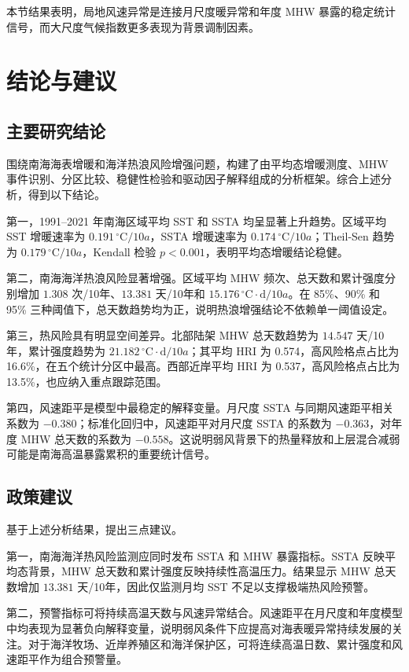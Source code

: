 \documentclass[UTF8,a4paper,zihao=-4,fontset=fandol]{ctexart}
\begin{document}
本节结果表明，局地风速异常是连接月尺度暖异常和年度 MHW 暴露的稳定统计信号，而大尺度气候指数更多表现为背景调制因素。

\section{结论与建议}

\subsection{主要研究结论}
围绕南海海表增暖和海洋热浪风险增强问题，构建了由平均态增暖测度、MHW 事件识别、分区比较、稳健性检验和驱动因子解释组成的分析框架。综合上述分析，得到以下结论。

第一，1991--2021 年南海区域平均 SST 和 SSTA 均呈显著上升趋势。区域平均 SST 增暖速率为 $0.191\,^{\circ}\mathrm{C}/10a$，SSTA 增暖速率为 $0.174\,^{\circ}\mathrm{C}/10a$；Theil-Sen 趋势为 $0.179\,^{\circ}\mathrm{C}/10a$，Kendall 检验 $p<0.001$，表明平均态增暖结论稳健。

第二，南海海洋热浪风险显著增强。区域平均 MHW 频次、总天数和累计强度分别增加 $1.308$ 次/10年、$13.381$ 天/10年和 $15.176\,^{\circ}\mathrm{C}\cdot\mathrm{d}/10a$。在 85\%、90\% 和 95\% 三种阈值下，总天数趋势均为正，说明热浪增强结论不依赖单一阈值设定。

第三，热风险具有明显空间差异。北部陆架 MHW 总天数趋势为 $14.547$ 天/10年，累计强度趋势为 $21.182\,^{\circ}\mathrm{C}\cdot\mathrm{d}/10a$；其平均 HRI 为 0.574，高风险格点占比为 16.6\%，在五个统计分区中最高。西部近岸平均 HRI 为 0.537，高风险格点占比为 13.5\%，也应纳入重点跟踪范围。

第四，风速距平是模型中最稳定的解释变量。月尺度 SSTA 与同期风速距平相关系数为 $-0.380$；标准化回归中，风速距平对月尺度 SSTA 的系数为 $-0.363$，对年度 MHW 总天数的系数为 $-0.558$。这说明弱风背景下的热量释放和上层混合减弱可能是南海高温暴露累积的重要统计信号。

\subsection{政策建议}
基于上述分析结果，提出三点建议。

第一，南海海洋热风险监测应同时发布 SSTA 和 MHW 暴露指标。SSTA 反映平均态背景，MHW 总天数和累计强度反映持续性高温压力。结果显示 MHW 总天数增加 $13.381$ 天/10年，因此仅监测月均 SST 不足以支撑极端热风险预警。

第二，预警指标可将持续高温天数与风速异常结合。风速距平在月尺度和年度模型中均表现为显著负向解释变量，说明弱风条件下应提高对海表暖异常持续发展的关注。对于海洋牧场、近岸养殖区和海洋保护区，可将连续高温日数、累计强度和风速距平作为组合预警量。
\end{document}
